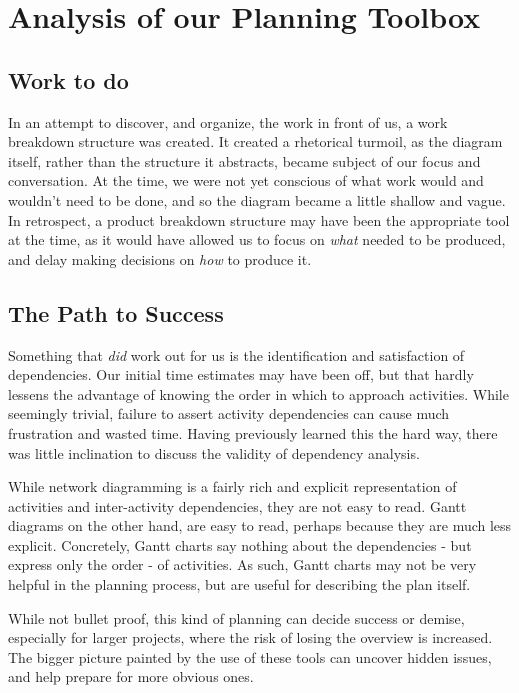 \section{Analysis of our Planning Toolbox}
\subsection{Work to do}
In an attempt to discover, and organize, the work in front of us, a work
breakdown structure was created. It created a rhetorical turmoil, as the
diagram itself, rather than the structure it abstracts, became subject of our
focus and conversation. At the time, we were not yet conscious of what work
would and wouldn't need to be done, and so the diagram became a little shallow
and vague. In retrospect, a product breakdown structure may have been the
appropriate tool at the time, as it would have allowed us to focus on
\emph{what} needed to be produced, and delay making decisions on \emph{how} to
produce it\cite[ch.~8.3,~8.4]{caye}.

\subsection{The Path to Success}
Something that \emph{did} work out for us is the identification and satisfaction
of dependencies. Our initial time estimates may have been off, but that hardly
lessens the advantage of knowing the order in which to approach activities.
While seemingly trivial, failure to assert activity dependencies can cause much
frustration and wasted time. Having previously learned this the hard way, there
was little inclination to discuss the validity of dependency analysis.

While network diagramming is a fairly rich and explicit representation of
activities and inter-activity dependencies, they are not easy to read.  Gantt
diagrams on the other hand, are easy to read, perhaps because they are much less
explicit. Concretely, Gantt charts say nothing about the dependencies - but
express only the order - of activities. As such, Gantt charts may not be very
helpful in the planning process, but are useful for describing the plan itself.
\cite[ch.~8.6]{caye}

While not bullet proof, this kind of planning can decide success or
demise\cite[ch.~8]{caye}, especially for larger projects, where the risk of
losing the overview is increased. The bigger picture painted by the use of
these tools can uncover hidden issues, and help prepare for more obvious ones.
